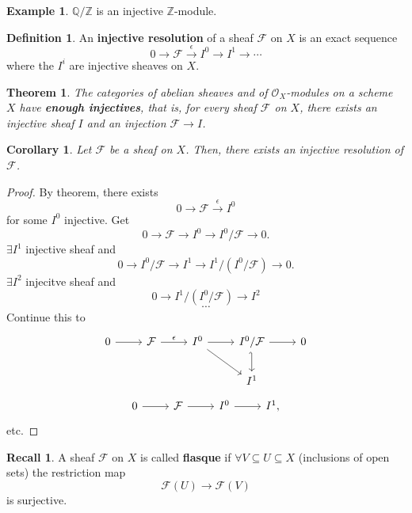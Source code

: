 \documentclass[12pt]{article}
\newtheorem*{theorem}{Theorem}
\newtheorem*{corollary}{Corollary}
\theoremstyle{definition}
\newtheorem*{definition}{Definition}
\newtheorem*{recall}{Recall}
\newtheorem*{example}{Example}
\begin{document}
\begin{example}
$\mathbb Q/\mathbb Z$ is an injective $\mathbb Z$-module.
\end{example}

\begin{definition}
An \textbf{injective resolution} of a sheaf $\mathcal F$ on $X$ is an exact sequence
\[0\longrightarrow\mathcal F\overset\epsilon\longrightarrow I^0\longrightarrow I^1\longrightarrow\cdots\]
where the $I^i$ are injective sheaves on $X$.
\end{definition}

\begin{theorem}
The categories of abelian sheaves and of $\mathcal O_X$-modules on a scheme $X$ have \textbf{enough injectives}, that is, for every sheaf $\mathcal F$ on $X$, there exists an injective sheaf $I$ and an injection $\mathcal F\rightarrow I$.
\end{theorem}

\begin{corollary}
Let $\mathcal F$ be a sheaf on $X$. Then, there exists an injective resolution of $\mathcal F$.
\end{corollary}

\begin{proof}
By theorem, there exists
\[0\longrightarrow\mathcal F\overset\epsilon\longrightarrow I^0\]
for some $I^0$ injective. Get
\[0\longrightarrow\mathcal F\longrightarrow I^0\longrightarrow I^0/\mathcal F\longrightarrow0.\]
$\exists I^1$ injective sheaf and
\[0\longrightarrow I^0/\mathcal F\longrightarrow I^1\longrightarrow I^1/(I^0/\mathcal F)\longrightarrow0.\]
$\exists I^2$ injecitve sheaf and
\[0\longrightarrow I^1/(I^0/\mathcal F)\longrightarrow I^2\]
\[\cdots\]
Continue this to
\[\begin{tikzcd}0\arrow[r]&\mathcal F\arrow[r,"\epsilon"]&I^0\arrow[r]\arrow[rd]&I^0/\mathcal F\arrow[r]\arrow[d,hook']&0\\&&&I^1\end{tikzcd}\]
\[\begin{tikzcd}0\arrow[r]&\mathcal F\arrow[r]&I^0\arrow[r]&I^1,\end{tikzcd}\]
etc.
\end{proof}

\begin{recall}
A sheaf $\mathcal F$ on $X$ is called \textbf{flasque} if $\forall V\subseteq U\subseteq X$ (inclusions of open sets) the restriction map
\[\mathcal F(U)\longrightarrow\mathcal F(V)\]
is surjective.
\end{recall}
\end{document}
